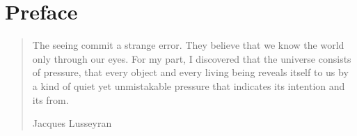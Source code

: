 
\newcommand{\txtincludes}{\ \textrm{includes}\ }
\newcommand{\txtcovers}{ \ \textit{covers}\ }
\newcommand{\statement}[1]{\textit{#1}}
\newcommand{\covered}{\prec}
\newcommand{\aesthetic}{{\ae}sthetic}
\newcommand{\aesthetics}{\aesthetic s}
\newcommand{\telos}{telos} %
\chapter*{Preface}\label{ch:mysticism}


%

\begin{quote}
  The seeing commit a strange error.  
  They believe that we know the world only through our eyes.
  For my part, I discovered that the universe consists of pressure,
  that every object and every living being reveals itself to us by
  a kind of quiet yet unmistakable pressure that indicates its intention and its from.

 \hfill Jacques Lusseyran \cite*{Lusseyran2006}
\end{quote}



